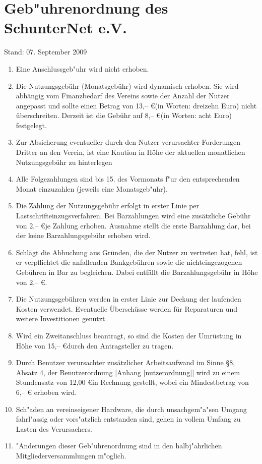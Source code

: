 

\section{Geb"uhrenordnung des SchunterNet e.V.}
\label{gebuehr}

{\small Stand: 07. September 2009}

\begin{enumerate}
\item Eine Anschlussgeb"uhr wird nicht erhoben.

\item Die Nutzungsgebühr (Monatsgebühr) wird dynamisch erhoben. Sie wird
  abhängig vom Finanzbedarf des Vereins sowie der Anzahl der Nutzer
  angepasst und sollte einen Betrag von 13,-- \euro (in Worten: dreizehn
  Euro) nicht überschreiten. Derzeit ist die Gebühr auf 8,-- \euro (in Worten: acht Euro) festgelegt.
\item Zur Absicherung eventueller durch den Nutzer verursachter Forderungen Dritter an den Verein, ist eine Kaution in Höhe der aktuellen monatlichen Nutzungsgebühr zu hinterlegen

\item Alle Folgezahlungen sind bis 15. des Vormonats f"ur den
  entsprechenden Monat einzuzahlen (jeweils eine Monatsgeb"uhr).

\item Die Zahlung der Nutzungsgebühr erfolgt in erster Linie per Lastschrifteinzugsverfahren. Bei Barzahlungen wird eine zusätzliche Gebühr von 2,-- \euro je Zahlung erhoben. Ausnahme stellt die erste Barzahlung dar, bei der keine Barzahlungsgebühr erhoben wird.
\item Schlägt die Abbuchung aus Gründen, die der Nutzer zu vertreten hat, fehl, ist er verpflichtet die anfallenden Bankgebühren sowie die nichteingezogenen Gebühren in Bar zu begleichen. Dabei entfällt die Barzahlungsgebühr in Höhe von 2,-- \euro.
\item  Die Nutzungsgebühren werden in erster Linie zur Deckung der laufenden Kosten verwendet. Eventuelle Überschüsse werden für Reparaturen und weitere Investitionen genutzt.

\item Wird ein Zweitanschluss beantragt, so sind die Kosten der
  Umrüstung in Höhe von 15,-- \euro durch den Antragsteller zu tragen.

\item Durch Benutzer verursachter zusätzlicher Arbeitsaufwand im Sinne
  §8, Absatz 4, der Benutzerordnung [Anhang \ref{nutzerordnung}] wird zu einem Stundensatz von
  12,00 \euro in Rechnung gestellt, wobei ein Mindestbetrag von 6,-- \euro
  erhoben wird. 


\item Sch"aden an vereinseigener Hardware, die durch unsachgem"a"sen Umgang
  fahrl"assig oder vors"atzlich entstanden sind, gehen in vollem Umfang zu
  Lasten des Verursachers.

\item "Anderungen dieser Geb"uhrenordnung sind in den halbj"ahrlichen
  Mitgliederversammlungen m"oglich.
\end{enumerate}
